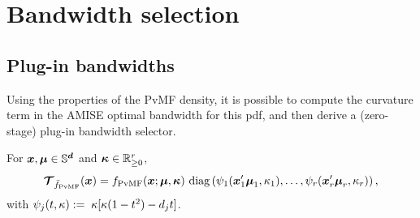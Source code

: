\documentclass[oneside,11pt]{article}
\begin{document}
\section{Bandwidth selection}
\label{sec:bw}

\subsection{Plug-in bandwidths}
\label{sec:bw_pi}

Using the properties of the PvMF density, it is possible to compute the curvature term in the AMISE optimal bandwidth for this pdf, and then derive a (zero-stage) plug-in bandwidth selector.

\begin{proposition}\label{prop:nabla2}
For $\boldsymbol{x},\boldsymbol\mu\in\mathbb{S}^{\boldsymbol{d}}$ and $\boldsymbol\kappa\in\mathbb{R}_{\geq 0}^r$,
\begin{align*}
    \bT_{\bar{f}_{\mathrm{PvMF}}}(\bx)=f_{\mathrm{PvMF}}(\bx;\bmu,\bkappa)\ \diag{\psi_1(\bx_1'\bmu_1,\kappa_1),\ldots,\psi_r(\bx_r'\bmu_r,\kappa_r)},
\end{align*}
with $\psi_j(t,\kappa):=\;\kappa[\kappa(1-t^2)-d_jt]$.
\end{proposition}
\end{document}
